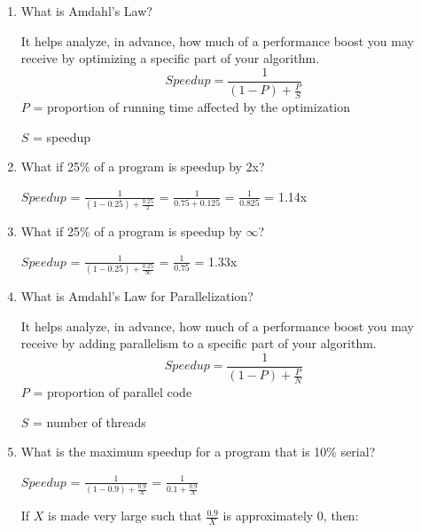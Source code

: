 \documentclass[12pt]{article}
\newenvironment{QandA}{\begin{enumerate}[label=\bfseries\alph*.]\bfseries}
                      {\end{enumerate}}
\newenvironment{answered}{\par\quad\normalfont}{}
\begin{document}
\begin{QandA}
    \item What is Amdahl's Law?
        \begin{answered}
        It helps analyze, in advance, how much of a performance boost you may receive by optimizing a specific part of your algorithm. 
        \begin{equation}
            Speedup = \frac{1}{(1-P)+\frac{P}{S}}
        \end{equation}
        $P$ = proportion of running time affected by the optimization
        
        $S$ = speedup
        \end{answered}
        
    \item What if 25\% of a program is speedup by 2x?
        \begin{answered}
        $Speedup$ = $\frac{1}{(1-0.25) + \frac{0.25}{2}}$ = $\frac{1}{0.75 + 0.125}$ = $\frac{1}{0.825}$ = 1.14x
        \end{answered}
        
    \item What if 25\% of a program is speedup by $\infty$?
        \begin{answered}
        $Speedup$ = $\frac{1}{(1-0.25) + \frac{0.25}{\infty}}$ = $\frac{1}{0.75}$ = 1.33x
        \end{answered}
        
    \item What is Amdahl's Law for Parallelization?
        \begin{answered}
        It helps analyze, in advance, how much of a performance boost you may receive by adding parallelism to a specific part of your algorithm. 
        \begin{equation}
            Speedup = \frac{1}{(1-P)+\frac{P}{N}}
        \end{equation}
        $P$ = proportion of parallel code
        
        $S$ = number of threads
        \end{answered}
    
    \item What is the maximum speedup for a program that is 10\% serial?
        \begin{answered}
        $Speedup$ = $\frac{1}{(1-0.9) + \frac{0.9}{X}}$ = $\frac{1}{0.1 + \frac{0.9}{X}}$
        
        If $X$ is made very large such that $\frac{0.9}{X}$ is approximately $0$, then:
        

\end{answered}
\end{QandA}
\end{document}
